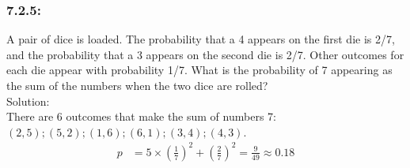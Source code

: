 \documentclass[a4paper]{article}
\begin{document}
	\subsubsection*{7.2.5:} A pair of dice is loaded. The probability that a 4 appears on the first die is 2/7, and the probability that a 3 appears on the second die is 2/7. Other outcomes for each die appear with probability 1/7. What is the probability of 7 appearing as the sum of the numbers when the two dice are rolled? \\
	\textit{}{Solution:} \\
	There are 6 outcomes that make the sum of numbers 7: $(2,5);(5,2);(1,6);(6,1);(3,4);(4,3)$. \\
	\begin{align*}
	    p &= 5\times (\frac{1}{7})^{2} + (\frac{2}{7})^{2} = \frac{9}{49} \approx 0.18  
	\end{align*}
\end{document}
